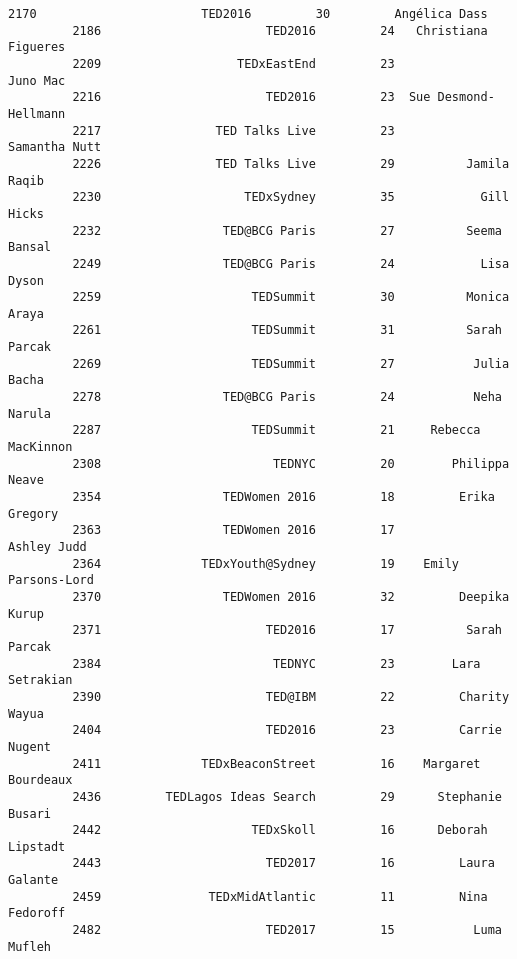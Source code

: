 \documentclass[11pt]{article}
\begin{document}
\begin{Verbatim}[commandchars=\\\{\}]
         2170                       TED2016         30         Angélica Dass   
         2186                       TED2016         24   Christiana Figueres   
         2209                   TEDxEastEnd         23              Juno Mac   
         2216                       TED2016         23  Sue Desmond-Hellmann   
         2217                TED Talks Live         23         Samantha Nutt   
         2226                TED Talks Live         29          Jamila Raqib   
         2230                    TEDxSydney         35            Gill Hicks   
         2232                 TED@BCG Paris         27          Seema Bansal   
         2249                 TED@BCG Paris         24            Lisa Dyson   
         2259                     TEDSummit         30          Monica Araya   
         2261                     TEDSummit         31          Sarah Parcak   
         2269                     TEDSummit         27           Julia Bacha   
         2278                 TED@BCG Paris         24           Neha Narula   
         2287                     TEDSummit         21     Rebecca MacKinnon   
         2308                        TEDNYC         20        Philippa Neave   
         2354                 TEDWomen 2016         18         Erika Gregory   
         2363                 TEDWomen 2016         17           Ashley Judd   
         2364              TEDxYouth@Sydney         19    Emily Parsons-Lord   
         2370                 TEDWomen 2016         32         Deepika Kurup   
         2371                       TED2016         17          Sarah Parcak   
         2384                        TEDNYC         23        Lara Setrakian   
         2390                       TED@IBM         22         Charity Wayua   
         2404                       TED2016         23         Carrie Nugent   
         2411              TEDxBeaconStreet         16    Margaret Bourdeaux   
         2436         TEDLagos Ideas Search         29      Stephanie Busari   
         2442                     TEDxSkoll         16      Deborah Lipstadt   
         2443                       TED2017         16         Laura Galante   
         2459               TEDxMidAtlantic         11         Nina Fedoroff   
         2482                       TED2017         15           Luma Mufleh   
         

\end{Verbatim}
\end{document}

